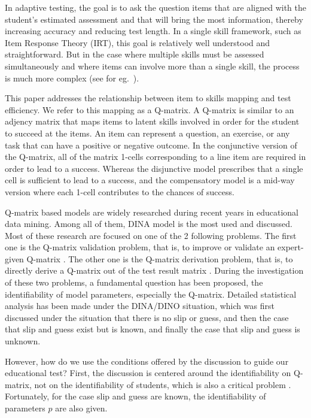 \documentclass{edm_template-no-copyright}
\begin{document}
In adaptive testing, the goal is to ask the question items that are aligned with the student's estimated assessment and that will bring the most information, thereby increasing accuracy and reducing test length.  In a single skill framework, such as Item Response Theory (IRT), this goal is relatively well understood and straightforward. But in the case where multiple skills must be assessed simultaneously and where items can involve more than a single skill, the process is much more complex (see for eg.\ ).

This paper addresses the relationship between item to skills mapping and test efficiency.  We refer to this mapping as a Q-matrix. A Q-matrix is similar to an adjency matrix that maps items to latent skills involved in order for the student to succeed at the items.  An item can represent a question, an exercise, or any task that can have a positive or negative outcome.  In the conjunctive version of the Q-matrix, all of the matrix 1-cells corresponding to a line item are required in order to lead to a success.  Whereas the disjunctive model prescribes that a single cell is sufficient to lead to a success, and the compensatory model is a mid-way version where each 1-cell contributes to the chances of success.

Q-matrix based models are widely researched during recent years in educational data mining. Among all of them, DINA model is the most used and discussed. Most of these research are focused on one of the 2 following problems. The first one is the Q-matrix validation problem, that is, to improve or validate an expert-given Q-matrix \cite{de2015general, chiu2013statistical, desmarais2013matrix}. The other one is the Q-matrix derivation problem, that is, to directly derive a Q-matrix out of the test result matrix \cite{barnes2010novel, liu2012data, desmarais2015combining, xu2016boosted}. During the investigation of these two problems, a fundamental question has been proposed, the identifiability of model parameters, especially the Q-matrix. Detailed statistical analysis has been made under the DINA/DINO situation, which was first discussed under the situation that there is no slip or guess, and then the case that slip and guess exist but is known, and finally the case that slip and guess is unknown. 

However, how do we use the conditions offered by the discussion to guide our educational test? First, the discussion is centered around the identifiability on Q-matrix, not on the identifiability of students, which is also a critical problem \cite{beck2007identifiability}. Fortunately, for the case slip and guess are known, the identifiability of parameters $p$ are also given. 
\end{document}
